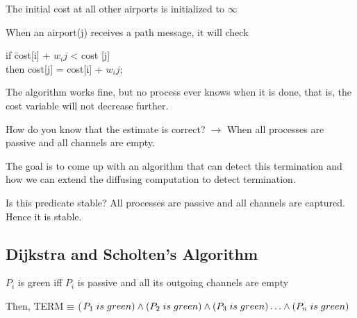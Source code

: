 \documentclass[twoside]{article}
\begin{document}
The initial cost at all other airports is initialized to $\infty$

When an airport(j) receives a path message, it will check

\begin{tabbing}
if \= cost[i]  + {$w_ij$} < cost [j] \\
\>then cost[j] = cost[i] + {$w_ij$};
\end{tabbing}

\begin{figure}[H]
\centering
{}
\end{figure}

The algorithm works fine, but no process ever knows when it is done, that is, the cost variable will not decrease further. 

How do you know that the estimate is correct? $\rightarrow$ When all processes are passive and all channels are empty.

The goal is to come up with an algorithm that can detect this termination and how we can extend the diffusing computation to detect termination.

Is this predicate stable?
All processes are passive and all channels are captured. Hence it is stable.

\subsection{Dijkstra and Scholten's Algorithm}
$P_i$ is green iff $P_i$ is passive and all its outgoing channels are empty

Then,
TERM$\hspace{1mm}\equiv$ ($P_1\hspace{1mm} is\hspace{1mm} green )\land (P_2\hspace{1mm} is\hspace{1mm} green ) \land(P_3\hspace{1mm} is\hspace{1mm} green ) \ldots \land (P_n\hspace{1mm} is\hspace{1mm} green )$
\end{document}
